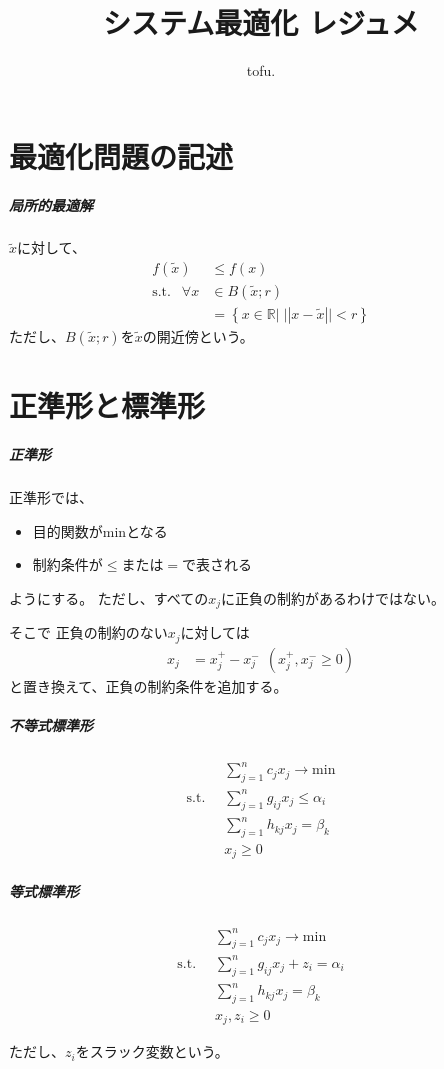 \documentclass[twocolumn]{ltjsarticle}
\title{システム最適化 レジュメ}
\author{tofu.}
\newcommand{\st}{
    \mathrm{s.t.}\;\;
}
\begin{document}
\maketitle
\section{最適化問題の記述}
\subparagraph{局所的最適解}
$\widetilde{x}$に対して、
\begin{align*}
    f(\widetilde{x})&\leq f(x)\\
    \st \ \forall x&\in B(\widetilde{x};r)\\
    &=\left\{x\in\mathbb{R}|\;||x-\widetilde{x}||<r\right\}
\end{align*}
ただし、$B(\widetilde{x};r)$を$\widetilde{x}$の開近傍という。
\section{正準形と標準形}
\subparagraph{正準形}
正準形では、
\begin{itemize}
    \item 目的関数がminとなる
    \item 制約条件が$\leq$または$=$で表される
\end{itemize}
ようにする。
ただし、すべての$x_j$に正負の制約があるわけではない。

そこで
正負の制約のない$x_j$に対しては
\begin{align*}
    x_j&=x_j^{+}-x_j^{-}\ \ (x_j^{+},x_j^{-}\geq0)
\end{align*}
と置き換えて、正負の制約条件を追加する。
\begin{multicols}{2}
    \subparagraph{不等式標準形}
    \begin{align*}
        &\sum_{j=1}^{n} c_jx_j \rightarrow \mathrm{min}\\
        \st &\sum_{j=1}^{n}g_{ij}x_j\leq \alpha_i\\
        &\sum_{j=1}^{n}h_{kj}x_j= \beta_k\\
        &x_j\geq 0
    \end{align*}
    \subparagraph{等式標準形}
    \begin{align*}
        &\sum_{j=1}^{n} c_jx_j \rightarrow \mathrm{min}\\
        \st &\sum_{j=1}^{n}g_{ij}x_j+z_i= \alpha_i\\
        &\sum_{j=1}^{n}h_{kj}x_j= \beta_k\\
        &x_j,z_i\geq 0
    \end{align*}
\end{multicols}
ただし、$z_i$をスラック変数という。
\end{document}
